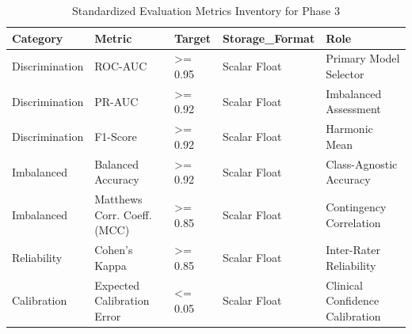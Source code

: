 \begin{table}
\caption{Standardized Evaluation Metrics Inventory for Phase 3}
\begin{tabular}{lllll}
\toprule
Category & Metric & Target & Storage_Format & Role \\
\midrule
Discrimination & ROC-AUC & >= 0.95 & Scalar Float & Primary Model Selector \\
Discrimination & PR-AUC & >= 0.92 & Scalar Float & Imbalanced Assessment \\
Discrimination & F1-Score & >= 0.92 & Scalar Float & Harmonic Mean \\
Imbalanced & Balanced Accuracy & >= 0.92 & Scalar Float & Class-Agnostic Accuracy \\
Imbalanced & Matthews Corr. Coeff. (MCC) & >= 0.85 & Scalar Float & Contingency Correlation \\
Reliability & Cohen's Kappa & >= 0.85 & Scalar Float & Inter-Rater Reliability \\
Calibration & Expected Calibration Error & <= 0.05 & Scalar Float & Clinical Confidence Calibration \\
\bottomrule
\end{tabular}
\end{table}
